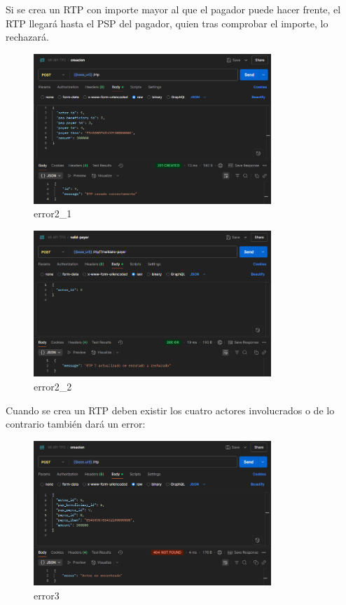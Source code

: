 Si se crea un RTP con importe mayor al que el pagador puede hacer frente, el RTP llegará hasta el PSP del pagador, quien tras comprobar el importe, lo rechazará.

    \begin{figure}[H]
    \centering
    \includegraphics[width=0.8\textwidth]{Imagenes/error2_1.png}
    \caption{error2\_1}
    \label{fig:error2_1}
    \end{figure}

    \begin{figure}[H]
    \centering
    \includegraphics[width=0.8\textwidth]{Imagenes/error2_2.png}
    \caption{error2\_2}
    \label{fig:error2_2}
    \end{figure}

Cuando se crea un RTP deben existir los cuatro actores involucrados o de lo contrario también dará un error:

    \begin{figure}[H]
    \centering
    \includegraphics[width=0.8\textwidth]{Imagenes/error3.png}
    \caption{error3}
    \label{fig:error3}
    \end{figure}
